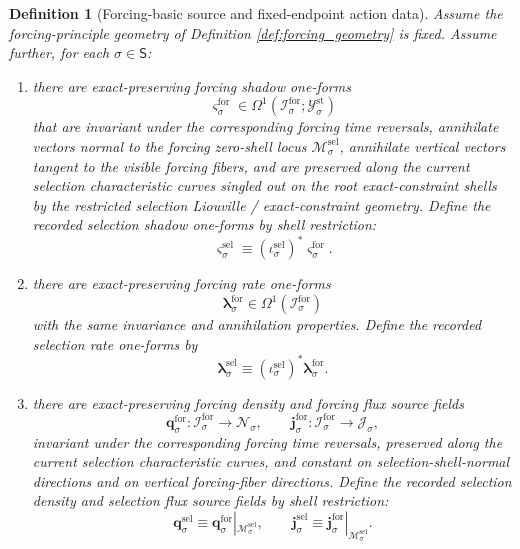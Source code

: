 \documentclass[11pt]{article}
\newcommand{\SectorSet}{\mathsf S}
\newcommand{\StatTagClass}[1]{\mathcal Y_{#1}^{\mathrm{st}}}
\newcommand{\DensityClass}[1]{\mathscr N_{#1}}
\newcommand{\FluxClass}[1]{\mathscr J_{#1}}
\newcommand{\SelSpace}[1]{\mathcal M_{#1}^{\mathrm{sel}}}
\newcommand{\SelInc}[1]{\iota_{#1}^{\mathrm{sel}}}
\newcommand{\SelShadowForm}[1]{\boldsymbol{\varsigma}_{#1}^{\mathrm{sel}}}
\newcommand{\SelRateForm}[1]{\boldsymbol{\lambda}_{#1}^{\mathrm{sel}}}
\newcommand{\SelDensitySource}[1]{\boldsymbol{q}_{#1}^{\mathrm{sel}}}
\newcommand{\SelFluxSource}[1]{\boldsymbol{j}_{#1}^{\mathrm{sel}}}
\newcommand{\ForSpace}[1]{\mathcal I_{#1}^{\mathrm{for}}}
\newcommand{\ForShadowForm}[1]{\boldsymbol{\varsigma}_{#1}^{\mathrm{for}}}
\newcommand{\ForRateForm}[1]{\boldsymbol{\lambda}_{#1}^{\mathrm{for}}}
\newcommand{\ForDensitySource}[1]{\boldsymbol{q}_{#1}^{\mathrm{for}}}
\newcommand{\ForFluxSource}[1]{\boldsymbol{j}_{#1}^{\mathrm{for}}}
\newtheorem{definition}{Definition}
\begin{document}
\begin{definition}[Forcing-basic source and fixed-endpoint action data]
\label{def:forcing_basic}
Assume the forcing-principle geometry of Definition \ref{def:forcing_geometry} is fixed. Assume further, for each \(\sigma\in\SectorSet\):
\begin{enumerate}
    \item there are exact-preserving forcing shadow one-forms
    \[
    \ForShadowForm{\sigma}\in\Omega^1(\ForSpace{\sigma};\StatTagClass{\sigma})
    \]
    that are invariant under the corresponding forcing time reversals, annihilate vectors normal to the forcing zero-shell locus \(\SelSpace{\sigma}\), annihilate vertical vectors tangent to the visible forcing fibers, and are preserved along the current selection characteristic curves singled out on the root exact-constraint shells by the restricted selection Liouville / exact-constraint geometry. Define the recorded selection shadow one-forms by shell restriction:
    \begin{equation}
    \SelShadowForm{\sigma}\equiv (\SelInc{\sigma})^*\ForShadowForm{\sigma}.
    \label{eq:selection_shadow_from_forcing}
    \end{equation}
    \item there are exact-preserving forcing rate one-forms
    \[
    \ForRateForm{\sigma}\in\Omega^1(\ForSpace{\sigma})
    \]
    with the same invariance and annihilation properties. Define the recorded selection rate one-forms by
    \begin{equation}
    \SelRateForm{\sigma}\equiv (\SelInc{\sigma})^*\ForRateForm{\sigma}.
    \label{eq:selection_rate_from_forcing}
    \end{equation}
    \item there are exact-preserving forcing density and forcing flux source fields
    \[
    \ForDensitySource{\sigma}:\ForSpace{\sigma}\to\DensityClass{\sigma},
    \qquad
    \ForFluxSource{\sigma}:\ForSpace{\sigma}\to\FluxClass{\sigma},
    \]
    invariant under the corresponding forcing time reversals, preserved along the current selection characteristic curves, and constant on selection-shell-normal directions and on vertical forcing-fiber directions. Define the recorded selection density and selection flux source fields by shell restriction:
    \begin{equation}
    \SelDensitySource{\sigma}\equiv \ForDensitySource{\sigma}|_{\SelSpace{\sigma}},
    \qquad
    \SelFluxSource{\sigma}\equiv \ForFluxSource{\sigma}|_{\SelSpace{\sigma}}.
    \label{eq:selection_sources_from_forcing}

\end{equation}
\end{enumerate}
\end{definition}
\end{document}
